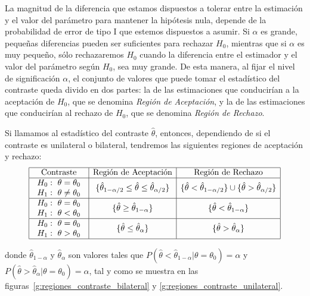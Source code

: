 La magnitud de la diferencia que estamos dispuestos a tolerar entre la
estimación y el valor del parámetro para mantener la hipótesis nula, depende de
la probabilidad de error de tipo I que estemos dispuestos a asumir. Si
$\alpha$ es grande, pequeñas diferencias pueden ser suficientes para rechazar
$H_0$, mientras que si $\alpha$ es muy pequeño, sólo rechazaremos $H_0$ cuando
la diferencia entre el estimador y el valor del parámetro según $H_0$, sea muy
grande. De esta manera, al fijar el nivel de significación $\alpha$, el
conjunto de valores que puede tomar el estadístico del contraste queda divido
en dos partes: la de las estimaciones que conducirían a la aceptación de $H_0$,
que se denomina \emph{Región de Aceptación}, y la de las estimaciones que
conducirían al rechazo de $H_0$, que se denomina \emph{Región de Rechazo}.

Si llamamos al estadístico del contraste $\hat{\theta}$, entonces, dependiendo
de si el contraste es unilateral o bilateral, tendremos las siguientes
regiones de aceptación y rechazo:
\[
\begin{array}{|c|c|c|}
\hline
\textrm{Contraste} & \textrm{Región de Aceptación} & \textrm{Región de Rechazo} \\
\hline
\begin{array}{l}
H_0:\ \theta=\theta_0\\
H_1:\ \theta\neq \theta_0
\end{array}
& \{\hat{\theta}_{1-\alpha/2}\leq \hat{\theta}\leq \hat{\theta}_{\alpha/2}\} &
\{\hat{\theta}<\hat{\theta}_{1-\alpha/2}\}\cup \{
\hat{\theta}>\hat{\theta}_{\alpha/2}\}\\
\hline
\begin{array}{l}
H_0:\ \theta=\theta_0\\
H_1:\ \theta<\theta_0
\end{array}
& \{\hat{\theta}\geq\hat{\theta}_{1-\alpha}\} &
\{\hat{\theta}<\hat{\theta}_{1-\alpha}\}\\
\hline
\begin{array}{l}
H_0:\ \theta=\theta_0\\
H_1:\ \theta>\theta_0
\end{array}
& \{\hat{\theta}\leq \hat{\theta}_{\alpha}\} &
\{\hat{\theta}>\hat{\theta}_{\alpha}\}\\
\hline
\end{array}
\]

donde $\hat{\theta}_{1-\alpha}$ y $\hat{\theta}_{\alpha}$ son valores tales
que $P(\hat{\theta}<\hat{\theta}_{1-\alpha}|\theta=\theta_0)=\alpha$ y
$P(\hat{\theta}>\hat{\theta}_{\alpha}|\theta=\theta_0)=\alpha$, tal y como se
muestra en las figuras~\ref{g:regiones_contraste_bilateral} y \ref{g:regiones_contraste_unilateral}.

